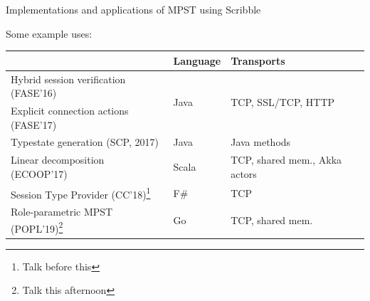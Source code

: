 \documentclass[aspectratio=1610]{beamer}
\begin{document}
\begin{frame}{Implementations and applications of MPST using Scribble}

  Some example uses:

  \begin{table}
  \begin{tabular}{lll}
    \toprule
    & Language & Transports\\
    \midrule
    Hybrid session verification (FASE'16)  & \multirow{2}{*}{Java} &\multirow {2}{*}{\small TCP, SSL/TCP, HTTP}\\
    Explicit connection actions (FASE'17)  &      &\\
    Typestate generation (SCP, 2017)       & Java &\small Java methods\\
    Linear decomposition (ECOOP'17)        & Scala&\small TCP, shared mem., Akka actors\\
    Session Type Provider (CC'18)\footnote{Talk before this}     & F\#  &\small TCP\\
    Role-parametric MPST (POPL'19)\footnote{Talk this afternoon} & Go   &\small TCP, shared mem.\\
    \bottomrule
  \end{tabular}
  \end{table}
\end{frame}
\end{document}
